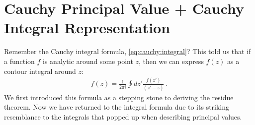\section{Cauchy Principal Value + Cauchy Integral Representation}

Remember the Cauchy integral formula, \eqref{eq:cauchy:integral}? This told us that if a function $f$ is analytic around some point $z$, then we can express $f(z)$ as a contour integral around $z$:
\begin{align}
	f(z) = \frac{1}{2\pi i}\oint dz' \frac{f(z')}{(z'-z)} \ .
\end{align}
We first introduced this formula as a stepping stone to deriving the residue theorem. Now we have returned to the integral formula due to its striking resemblance to the integrals that popped up when describing principal values.

